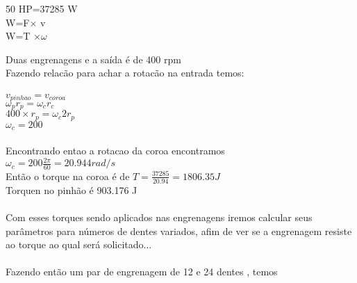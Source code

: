 \documentclass[11pt,a4paper]{article}
\begin{document}
50 HP=37285 W\\
W=F$\times $ v\\
W=T $\times \omega $

Duas engrenagens e a saída é de 400 rpm\\
Fazendo relacão para achar a rotacão na entrada temos:\\\\
$v_{pinhao}=v_{coroa}$\\
$\omega_p r_p =\omega_c r_c$\\
$400 \times r_p= \omega_c 2r_p$\\
$\omega_c=200$\\\\
Encontrando entao a rotacao da coroa encontramos\\
$\omega_c=200 \frac{2\pi}{60}=20.944 rad/s$\\
Então o torque na coroa é de 
$T=\frac{37285}{20.94}=1806.35 J$\\
Torquen no pinhão é 903.176 J\\\\
Com esses torques sendo aplicados nas engrenagens iremos calcular seus parâmetros para números de dentes variados, afim de ver se a engrenagem resiste ao torque ao qual será solicitado...\\\\

Fazendo então um par de engrenagem de 12 e 24 dentes , temos
\end{document}
